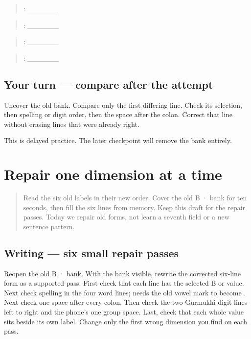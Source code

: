 \begin{quote}
: \_\_\_\_\_\_
\end{quote}

\begin{quote}
: \_\_\_\_\_\_
\end{quote}

\begin{quote}
: \_\_\_\_\_\_
\end{quote}

\begin{quote}
: \_\_\_\_\_\_
\end{quote}

\subsection*{Your turn — compare after the attempt}
Uncover the old bank. Compare only the first differing line. Check its selection, then spelling or digit order, then the space after the colon. Correct that line without erasing lines that were already right.

\begin{tcolorbox}[breakable,colback=teal!4,colframe=teal!35!black,title={Before you move on}]
This is delayed practice. The later checkpoint will remove the bank entirely.
\end{tcolorbox}
\section[\texorpdfstring{\pa{ਰਿਹਾਇਸ਼}: \pa{ਸ਼ਹਿਰ} … (repair six …)}{ਰਿਹਾਇਸ਼: ਸ਼ਹਿਰ … (repair six …)}]{Repair one dimension at a time}

\label{lesson:PA-W11-form-six-repair}



\begin{quote}
Read the six old labels in their new order. Cover the old B ·  bank for ten seconds, then fill the six lines from memory. Keep this draft for the repair passes. Today we repair old forms, not learn a seventh field or a new sentence pattern.
\end{quote}

\subsection*{Writing — six small repair passes}
Reopen the old B ·  bank. With the bank visible, rewrite the corrected six-line form as a supported pass. First check that each line has the selected B or  value. Next check spelling in the four word lines; \textbf{} needs the old vowel mark to become \textbf{}. Next check one space after every colon. Then check the two Gurmukhi digit lines left to right and the phone's one group space. Last, check that each whole value sits beside its own label. Change only the first wrong dimension you find on each pass.

